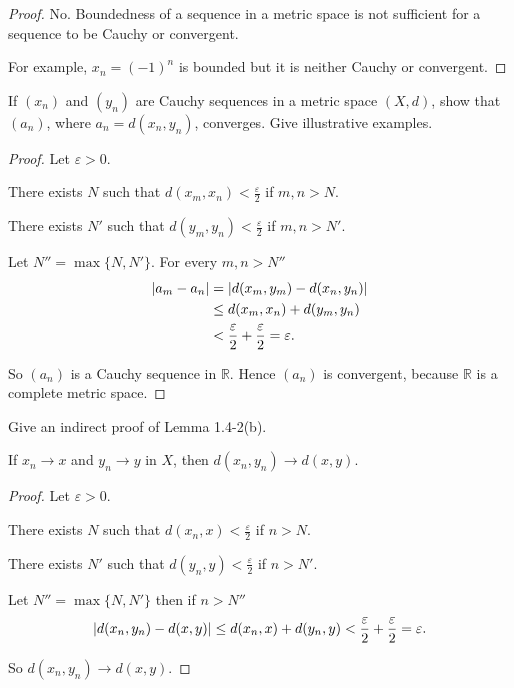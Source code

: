 \begin{proof}
    No. Boundedness of a sequence in a metric space is not sufficient for a sequence to be Cauchy or convergent.

    For example, $x_{n} = {(-1)}^{n}$ is bounded but it is neither Cauchy or convergent.
\end{proof}

\begin{exercise}\label{chapter1:section4:exercise6}
    If $(x_{n})$ and $(y_{n})$ are Cauchy sequences in a metric space $(X, d)$, show that $(a_{n})$, where $a_{n} = d(x_{n}, y_{n})$, converges. Give illustrative examples.
\end{exercise}

\begin{proof}
    Let $\varepsilon > 0$.

    There exists $N$ such that $d(x_{m}, x_{n}) < \frac{\varepsilon}{2}$ if $m, n > N$.

    There exists $N'$ such that $d(y_{m}, y_{n}) < \frac{\varepsilon}{2}$ if $m, n > N'$.

    Let $N'' = \max\{ N, N' \}$. For every $m, n > N''$
    \begin{align*}
        \left\vert{a_{m} - a_{n}}\right\vert & = \left\vert{d(x_{m}, y_{m}) - d(x_{n}, y_{n})}\right\vert                      \\
                            & \leq d(x_{m}, x_{n}) + d(y_{m}, y_{n})                         \\
                            & < \frac{\varepsilon}{2} + \frac{\varepsilon}{2} = \varepsilon.
    \end{align*}

    So ${(a_{n})}$ is a Cauchy sequence in $\mathbb{R}$. Hence ${(a_{n})}$ is convergent, because $\mathbb{R}$ is a complete metric space.
\end{proof}

\begin{exercise}\label{chapter1:section4:exercise7}
    Give an indirect proof of Lemma 1.4-2(b).

    If $x_{n}\to x$ and $y_{n}\to y$ in $X$, then $d(x_{n}, y_{n}) \to d(x, y)$.
\end{exercise}

\begin{proof}
    Let $\varepsilon > 0$.

    There exists $N$ such that $d(x_{n}, x) < \frac{\varepsilon}{2}$ if $n > N$.

    There exists $N'$ such that $d(y_{n}, y) < \frac{\varepsilon}{2}$ if $n > N'$.

    Let $N'' = \max\{ N, N' \}$ then if $n > N''$
    \[
        \left\vert{d(x_{n}, y_{n}) - d(x, y)}\right\vert \leq d(x_{n}, x) + d(y_{n}, y) < \frac{\varepsilon}{2} + \frac{\varepsilon}{2} = \varepsilon.
    \]

    So $d(x_{n}, y_{n})\to d(x, y)$.
\end{proof}

